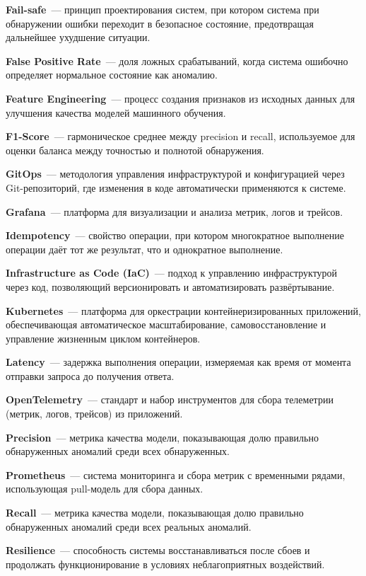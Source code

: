 \begin{sloppypar}
\textbf{Fail-safe}~--- принцип проектирования систем, при котором система при обнаружении ошибки переходит в безопасное состояние, предотвращая дальнейшее ухудшение ситуации.

\textbf{False Positive Rate}~--- доля ложных срабатываний, когда система ошибочно определяет нормальное состояние как аномалию.

\textbf{Feature Engineering}~--- процесс создания признаков из исходных данных для улучшения качества моделей машинного обучения.

\textbf{F1-Score}~--- гармоническое среднее между precision и recall, используемое для оценки баланса между точностью и полнотой обнаружения.

\textbf{GitOps}~--- методология управления инфраструктурой и конфигурацией через Git-репозиторий, где изменения в коде автоматически применяются к системе.

\textbf{Grafana}~--- платформа для визуализации и анализа метрик, логов и трейсов.

\textbf{Idempotency}~--- свойство операции, при котором многократное выполнение операции даёт тот же результат, что и однократное выполнение.

\textbf{Infrastructure as Code (IaC)}~--- подход к управлению инфраструктурой через код, позволяющий версионировать и автоматизировать развёртывание.

\textbf{Kubernetes}~--- платформа для оркестрации контейнеризированных приложений, обеспечивающая автоматическое масштабирование, самовосстановление и управление жизненным циклом контейнеров.

\textbf{Latency}~--- задержка выполнения операции, измеряемая как время от момента отправки запроса до получения ответа.

\textbf{OpenTelemetry}~--- стандарт и набор инструментов для сбора телеметрии (метрик, логов, трейсов) из приложений.

\textbf{Precision}~--- метрика качества модели, показывающая долю правильно обнаруженных аномалий среди всех обнаруженных.

\textbf{Prometheus}~--- система мониторинга и сбора метрик с временными рядами, использующая pull-модель для сбора данных.

\textbf{Recall}~--- метрика качества модели, показывающая долю правильно обнаруженных аномалий среди всех реальных аномалий.

\textbf{Resilience}~--- способность системы восстанавливаться после сбоев и продолжать функционирование в условиях неблагоприятных воздействий.


\end{sloppypar}
